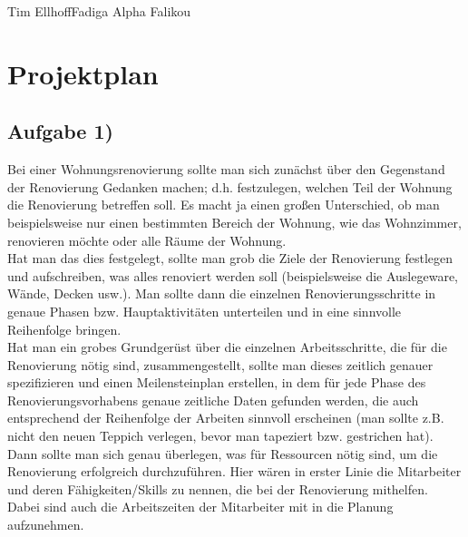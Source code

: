 \documentclass{swp1}
\begin{document}
          {Tim Ellhoff}{Fadiga	Alpha Falikou}{}
          
\section*{Projektplan}          
\subsection*{Aufgabe 1)}
Bei einer Wohnungsrenovierung sollte man sich zunächst über den Gegenstand der Renovierung Gedanken machen; d.h. festzulegen, welchen Teil der Wohnung die Renovierung betreffen soll. Es macht ja einen großen Unterschied, ob man beispielsweise nur einen bestimmten Bereich der Wohnung, wie das Wohnzimmer, renovieren möchte oder alle Räume der Wohnung. \\
Hat man das dies festgelegt, sollte man grob die Ziele der Renovierung festlegen und aufschreiben, was alles renoviert werden soll (beispielsweise die Auslegeware, Wände, Decken usw.).
Man sollte dann die einzelnen Renovierungsschritte in genaue Phasen bzw. Hauptaktivitäten unterteilen und in eine sinnvolle Reihenfolge bringen.\\
Hat man ein grobes Grundgerüst über die einzelnen Arbeitsschritte, die für die Renovierung nötig sind, zusammengestellt, sollte man dieses zeitlich genauer spezifizieren und einen Meilensteinplan erstellen, in dem für jede Phase des Renovierungsvorhabens genaue zeitliche Daten gefunden werden, die auch entsprechend der Reihenfolge der Arbeiten sinnvoll erscheinen (man sollte z.B. nicht den neuen Teppich verlegen, bevor man tapeziert bzw. gestrichen hat). \\

Dann sollte man sich genau überlegen, was für Ressourcen nötig sind, um die Renovierung erfolgreich durchzuführen. Hier wären in erster Linie die Mitarbeiter und deren Fähigkeiten/Skills zu nennen, die bei der Renovierung mithelfen. Dabei sind auch die Arbeitszeiten der Mitarbeiter mit in die Planung aufzunehmen. \\
\end{document}

